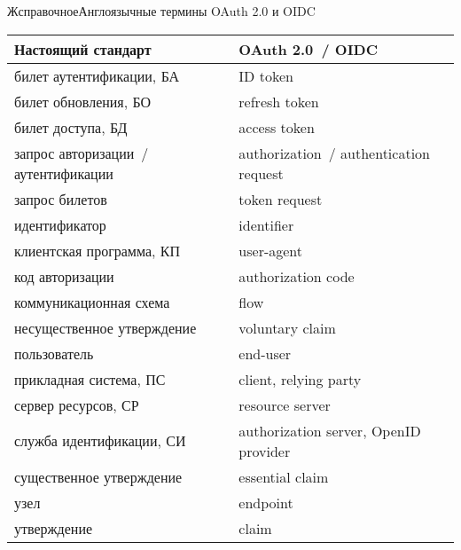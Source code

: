 \begin{appendix}{Ж}{справочное}{Англоязычные термины OAuth 2.0 и OIDC}\label{ENG}

\mbox{}

\begin{center}
\begin{tabular}{|p{8cm}|p{8cm}|}
\hline
Настоящий стандарт & OAuth 2.0~/ OIDC\\
\hline
\hline
билет аутентификации, БА & ID token\\
билет обновления, БО & refresh token\\
билет доступа, БД & access token\\
запрос авторизации~/ аутентификации & 
authorization~/ authentication request\\
запрос билетов & token request\\
идентификатор & identifier\\
клиентская программа, КП & user-agent\\
код авторизации & authorization code\\
коммуникационная схема & flow\\
несущественное утверждение & voluntary claim\\
пользователь & end-user\\
прикладная система, ПС & client, relying party\\
сервер ресурсов, СР & resource server\\
служба идентификации, СИ & authorization server, OpenID provider\\
существенное утверждение & essential claim\\
узел & endpoint\\
утверждение & claim\\
\hline
\end{tabular}
\end{center}

\end{appendix}